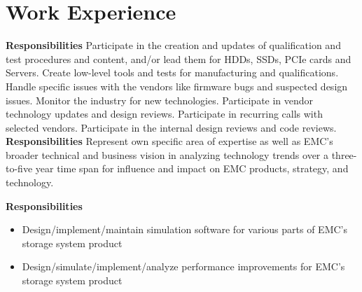 \section{Work Experience}

{
{\bfseries Responsibilities} Participate in the creation and updates of qualification and test procedures and content,
and/or lead them
for HDDs, SSDs, PCIe cards and Servers. Create low-level tools and tests for manufacturing and qualifications.
Handle specific issues with the vendors like firmware bugs and suspected design issues.
Monitor the industry for new technologies. Participate in vendor technology updates and design reviews.
Participate in recurring calls with selected vendors.
Participate in the internal design reviews and code reviews.}
{
}
{
}
{
}
{{\bfseries Responsibilities}
Represent own specific area of expertise as well as EMC's broader technical and business vision in analyzing technology
trends over a three-to-five year time span for influence and impact on EMC products, strategy, and technology.
}
{
}
{
}
{{\bfseries Responsibilities}
\begin{itemize}
\item  Design/implement/maintain simulation software for various parts of EMC's storage system product
\item  Design/simulate/implement/analyze performance improvements for EMC's storage system product
\end{itemize}
}
